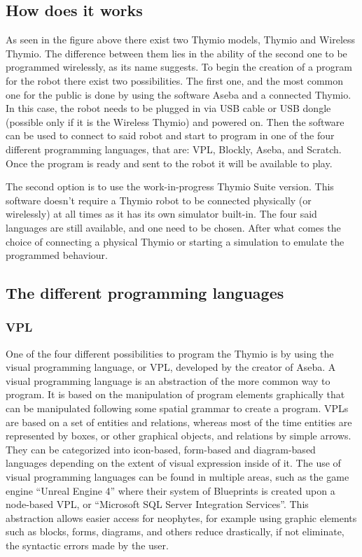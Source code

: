 \documentclass{scrartcl}
\begin{document}
\subsection{How does it works}

As seen in the figure above there exist two Thymio models, Thymio and Wireless Thymio. 
The difference between them lies in the ability of the second one to be programmed wirelessly, 
as its name suggests. To begin the creation of a program for the robot there exist two possibilities.
The first one, and the most common one for the public is done by using the software Aseba and a connected Thymio. 
In this case, the robot needs to be plugged in via USB cable or USB dongle (possible only if it is the Wireless Thymio) and powered on. 
Then the software can be used to connect to said robot and start to program in one of the four different programming languages, 
that are: VPL, Blockly, Aseba, and Scratch. Once the program is ready and sent to the robot it will be available to play.

The second option is to use the work-in-progress Thymio Suite version. 
This software doesn’t require a Thymio robot to be connected physically (or wirelessly) at all times as it has its own simulator built-in. 
The four said languages are still available, and one need to be chosen. 
After what comes the choice of connecting a physical Thymio or starting a simulation to emulate the programmed behaviour.

\subsection{The different programming languages}
\subsubsection{VPL}

One of the four different possibilities to program the Thymio is by using the visual programming language, or VPL, 
developed by the creator of Aseba. A visual programming language is an abstraction of the more common way to program. 
It is based on the manipulation of program elements graphically that can be manipulated following some spatial grammar to create a program. 
VPLs are based on a set of entities and relations, whereas most of the time entities are represented by boxes, 
or other graphical objects, and relations by simple arrows. They can be categorized into icon-based, 
form-based and diagram-based languages depending on the extent of visual expression inside of it. 
The use of visual programming languages can be found in multiple areas, such as the game engine “Unreal Engine 4” where their system of Blueprints is created upon a node-based VPL, 
or “Microsoft SQL Server Integration Services”. This abstraction allows easier access for neophytes, 
for example using graphic elements such as blocks, forms, diagrams, and others reduce drastically, if not eliminate, the syntactic errors made by the user.
\end{document}
